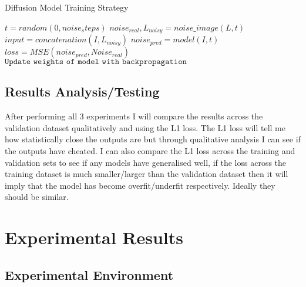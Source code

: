 \documentclass{UoYCSproject}
\begin{document}
\begin{algorithm}
\caption{Diffusion Model Training Strategy}\label{ALG:Diffusion}
\begin{algorithmic}[1]
\State
\State $t = random(0, noise_steps)$
\State $noise_{real}, L_{noisy} = noise\_image(L, t)$ 
\State
\State $input = concatenation(I, L_{noisy})$
\State $noise_{pred} = model(I, t)$
\State $loss = MSE( noise_{pred}, Noise_{real} )$
\State $\texttt{Update weights of model with backpropagation}$
\EndFor
\EndFor
\end{algorithmic}
\end{algorithm}

\section{Results Analysis/Testing}

After performing all 3 experiments I will compare the results across the validation dataset qualitatively and using the L1 loss. The L1 loss will tell me how statistically close the outputs are but through qualitative analysis I can see if the outputs have cheated. 
I can also compare the L1 loss across the training and validation sets to see if any models have generalised well, if the loss across the training dataset is much smaller/larger than the validation dataset then it will imply that the model has become overfit/underfit respectively. Ideally they should be similar. 

\newpage{}

\chapter{Experimental Results}



\section{Experimental Environment}
\end{document}
